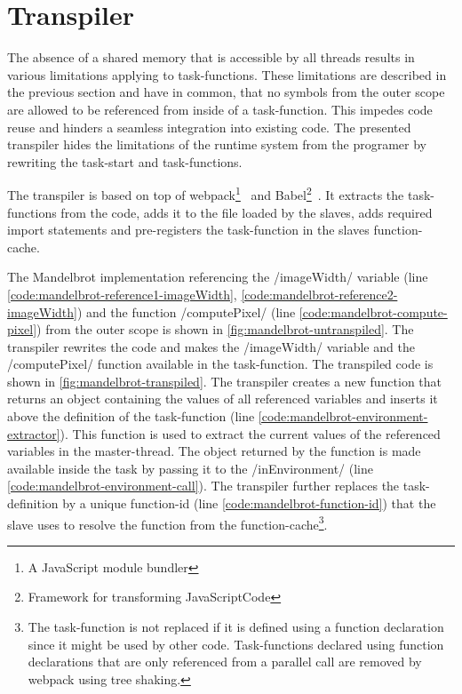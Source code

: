 \section{Transpiler}\label{sec:transpiler}
The absence of a shared memory that is accessible by all threads results in various limitations applying to task-functions. These limitations are described in the previous section and have in common, that no symbols from the outer scope are allowed to be referenced from inside of a task-function. This impedes code reuse and hinders a seamless integration into existing code. The presented transpiler hides the limitations of the runtime system from the programer by rewriting the task-start and task-functions.

The transpiler is based on top of webpack\footnote{A JavaScript module bundler}~\cite{webpack} and Babel\footnote{Framework for transforming JavaScriptCode}~\cite{babel}. It extracts the task-functions from the code, adds it to the file loaded by the slaves, adds required import statements and pre-registers the task-function in the slaves function-cache. 

The Mandelbrot implementation referencing the \javascriptinline/imageWidth/ variable (line \ref{code:mandelbrot-reference1-imageWidth}, \ref{code:mandelbrot-reference2-imageWidth}) and the function \javascriptinline/computePixel/ (line \ref{code:mandelbrot-compute-pixel}) from the outer scope is shown in \cref{fig:mandelbrot-untranspiled}. The transpiler rewrites the code and makes the \javascriptinline/imageWidth/ variable and the \javascriptinline/computePixel/ function available in the task-function. The transpiled code is shown in \cref{fig:mandelbrot-transpiled}. The transpiler creates a new function that returns an object containing the values of all referenced variables and inserts it above the definition of the task-function (line \ref{code:mandelbrot-environment-extractor}). This function is used to extract the current values of the referenced variables in the master-thread. The object returned by the function is made available inside the task by passing it to the \javascriptinline/inEnvironment/ (line \ref{code:mandelbrot-environment-call}). The transpiler further replaces the task-definition by a unique function-id (line \ref{code:mandelbrot-function-id}) that the slave uses to resolve the function from the function-cache\footnote{The task-function is not replaced if it is defined using a function declaration since it might be used by other code. Task-functions declared using function declarations that are only referenced from a parallel call are removed by webpack using tree shaking.}. 


